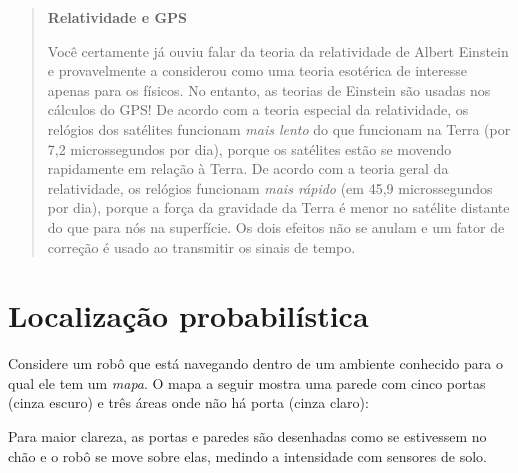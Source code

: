 \begin{quote}
\begin{center}
\textbf{Relatividade e GPS}
\end{center}
Você certamente já ouviu falar da teoria da relatividade de Albert Einstein e provavelmente a considerou como uma teoria esotérica de interesse apenas para os físicos. No entanto, as teorias de Einstein são usadas nos cálculos do GPS! De acordo com a teoria especial da relatividade, os relógios dos satélites funcionam \emph{mais lento} do que funcionam na Terra (por 7,2 microssegundos por dia), porque os satélites estão se movendo rapidamente em relação à Terra. De acordo com a teoria geral da relatividade, os relógios funcionam \emph{mais rápido} (em 45,9 microssegundos por dia), porque a força da gravidade da Terra é menor no satélite distante do que para nós na superfície. Os dois efeitos não se anulam e um fator de correção é usado ao transmitir os sinais de tempo.
\end{quote}

\section{Localização probabilística}\label{s.prob-local}

Considere um robô que está navegando dentro de um ambiente conhecido para o qual ele tem um \emph{mapa}. O mapa a seguir mostra uma parede com cinco portas (cinza escuro) e três áreas onde não há porta (cinza claro):

\begin{center}
\end{center}

Para maior clareza, as portas e paredes são desenhadas como se estivessem no chão e o robô se move sobre elas, medindo a intensidade com sensores de solo.


